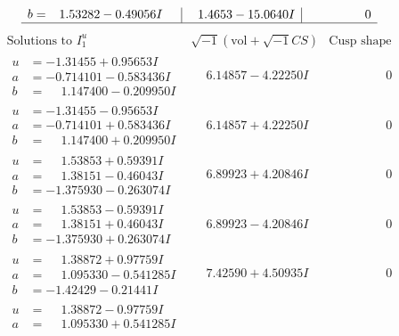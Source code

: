 \documentclass[1p]{elsarticle_modified}
\theoremstyle{definition}
\newcommand{\I}{\sqrt{-1}}
\begin{document}
$$\begin{array}{c|c|c}
\begin{aligned}
b &= \phantom{-}1.53282 - 0.49056 I\end{aligned}
 & \phantom{-}1.4653 - 15.0640 I & \phantom{-0.000000 } 0\\
 \hline 
 \end{array}$$\newpage$$\begin{array}{c|c|c}  
\text{Solutions to }I^u_{1}& \I (\text{vol} + \sqrt{-1}CS) & \text{Cusp shape}\\
 \hline 
\begin{aligned}
u &= -1.31455 + 0.95653 I \\
a &= -0.714101 - 0.583436 I \\
b &= \phantom{-}1.147400 - 0.209950 I\end{aligned}
 & \phantom{-}6.14857 - 4.22250 I & \phantom{-0.000000 } 0 \\ \hline\begin{aligned}
u &= -1.31455 - 0.95653 I \\
a &= -0.714101 + 0.583436 I \\
b &= \phantom{-}1.147400 + 0.209950 I\end{aligned}
 & \phantom{-}6.14857 + 4.22250 I & \phantom{-0.000000 } 0 \\ \hline\begin{aligned}
u &= \phantom{-}1.53853 + 0.59391 I \\
a &= \phantom{-}1.38151 - 0.46043 I \\
b &= -1.375930 - 0.263074 I\end{aligned}
 & \phantom{-}6.89923 + 4.20846 I & \phantom{-0.000000 } 0 \\ \hline\begin{aligned}
u &= \phantom{-}1.53853 - 0.59391 I \\
a &= \phantom{-}1.38151 + 0.46043 I \\
b &= -1.375930 + 0.263074 I\end{aligned}
 & \phantom{-}6.89923 - 4.20846 I & \phantom{-0.000000 } 0 \\ \hline\begin{aligned}
u &= \phantom{-}1.38872 + 0.97759 I \\
a &= \phantom{-}1.095330 - 0.541285 I \\
b &= -1.42429 - 0.21441 I\end{aligned}
 & \phantom{-}7.42590 + 4.50935 I & \phantom{-0.000000 } 0 \\ \hline\begin{aligned}
u &= \phantom{-}1.38872 - 0.97759 I \\
a &= \phantom{-}1.095330 + 0.541285 I \\

\end{aligned}
\end{array}$$
\end{document}
